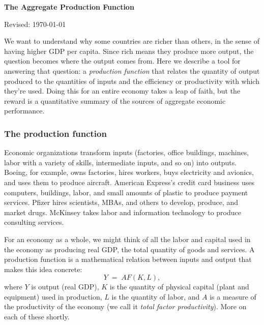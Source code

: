 \documentclass[letterpaper,12pt]{article}
\begin{document}
\thispagestyle{empty}%
\Head

\centerline{\large \bf The Aggregate Production Function}%
\centerline{Revised:  \today}

\bigskip
We want to understand why some countries are richer than others,
in the sense of having higher GDP per capita.
Since rich means they produce more output,
the question becomes where the output comes from.
Here we describe a tool for answering that question:
a {\it production function\/} that relates the quantity of output produced to
the quantities of inputs and the efficiency or productivity
with which they're used.
Doing this for an entire economy takes a leap of faith,
but the reward is a quantitative summary of the sources of
aggregate economic performance.


\subsubsection*{The production function}
\label{sec:production_function}

Economic organizations transform inputs (factories, office
buildings, machines, labor with a variety of skills, intermediate
inputs, and so on) into outputs.  Boeing, for example,
owns factories, hires workers, buys electricity and avionics, and
uses them to produce aircraft. American Express's credit card
business uses computers, buildings, labor, and small amounts of
plastic to produce payment services. Pfizer hires scientists,
MBAs, and others to develop, produce, and market drugs. McKinsey
takes labor and information technology to produce consulting
services.


For an economy as a whole, we might think of all the labor and capital
used in the economy as producing real GDP,
the total quantity of goods and services.
A production function is a mathematical relation between inputs and output
that makes this idea concrete:
\[
    Y \;=\; A F(K,L) ,
\]
where $Y$ is output (real GDP), $K$ is the quantity of physical capital
(plant and equipment) used in production,
$L$ is the quantity of labor,
and $A$ is a measure of the productivity of the economy
(we call it {\it total factor productivity\/}).
More on each of these shortly.
\end{document}
